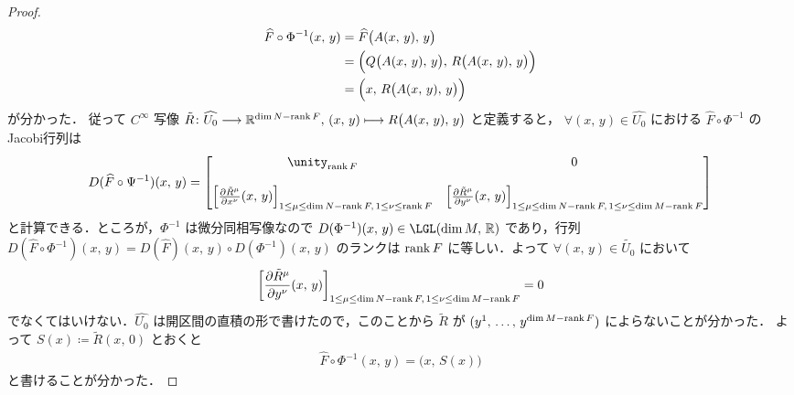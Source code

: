 \documentclass[TQFT_main]{subfiles}
\begin{document}
\begin{proof}
\begin{align}
        \widehat{F} \circ \Phi^{-1} (x,\, y)
        &= \widehat{F} \bigl( A(x,\, y),\, y \bigr)  \\
        &= \Bigl( Q \bigl( A(x,\, y),\, y \bigr),\,  R \bigl( A(x,\, y),\, y \bigr)  \Bigr) \\
        &= \Bigl( x,\,  R \bigl( A(x,\, y),\, y \bigr)  \Bigr)
    \end{align}
    が分かった．
    従って $C^\infty$ 写像 $\tilde{R} \colon \widehat{U_0} \longrightarrow \mathbb{R}^{\dim N -\rank F},\, (x,\, y) \longmapsto R \bigl( A(x,\, y),\, y \bigr)$ と定義すると，
    $\forall (x,\, y) \in \widehat{U_0}$ における $\widehat{F} \circ \Phi^{-1}$ のJacobi行列は
    \begin{align}
        D (\widehat{F} \circ \Psi^{-1}) (x,\, y) =
        \mqty[
            \unity_{\rank F} & 0 \\
            & \\
            \left[\pdv{\tilde{R}^\mu}{x^\nu}()(x,\, y)\right]_{1 \le \mu \le \dim N - \rank F,\, 1 \le \nu \le \rank F} & \left[\pdv{\tilde{R}^\mu}{y^\nu}()(x,\, y)\right]_{1 \le \mu \le \dim N - \rank F,\, 1 \le \nu \le \dim M - \rank F} \\ 
        ]
    \end{align}
    と計算できる．ところが，$\Phi^{-1}$ は微分同相写像なので $D(\Phi^{-1})(x,\, y) \in \LGL(\dim M,\, \mathbb{R})$ であり，行列 $D (\widehat{F} \circ \Phi^{-1})(x,\, y) = D(\widehat{F})(x,\, y) \circ D(\Phi^{-1})(x,\, y)$ のランクは $\rank F$ に等しい．よって $\forall (x,\, y) \in \tilde{U_0}$ において
    \begin{align}
        \left[\pdv{\tilde{R}^\mu}{y^\nu}()(x,\, y)\right]_{1 \le \mu \le \dim N - \rank F,\, 1 \le \nu \le \dim M - \rank F} = 0
    \end{align}
    でなくてはいけない．$\widehat{U_0}$ は開区間の直積の形で書けたので，このことから $\tilde{R}$ が $(y^1,\, \dots,\, y^{\dim M - \rank F})$ によらないことが分かった．
    よって $S(x) \coloneqq \tilde{R}(x,\, 0)$ とおくと
    \begin{align}
        \label{eq:thm-rank-1}
        \widehat{F} \circ \Phi^{-1}(x,\, y) = \bigl( x,\, S(x) \bigr) 
    \end{align}
    と書けることが分かった．


\end{proof}
\end{document}
